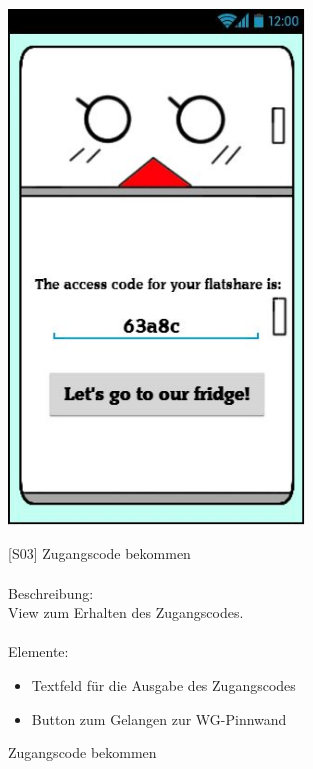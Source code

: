 \documentclass[a4paper]{scrreprt}
\begin{document}
    	\begin{figure}[h]
    		\begin{minipage}[b]{0.4\linewidth}
    			
    			\flushright
    			\centering
    			\includegraphics[width=0.7\textwidth]{fridget_accesscode.JPG}
    			\caption{Zugangscode bekommen}
    			\label{fig:figure1}
    			\vspace{13mm}
    		\end{minipage}
    		\hspace{0.5cm}
    		\begin{minipage}[b]{0.55\linewidth}
    			\flushleft
    			
    			{[}S03{]} Zugangscode bekommen \\
    			\hfill
    			\\Beschreibung: \\
    			View zum Erhalten des Zugangscodes.\\
    			\hfill
    			\\Elemente:
    			\begin{itemize}
    				\renewcommand\labelitemi{--}
    				\item Textfeld für die Ausgabe des Zugangscodes
    				\item Button zum Gelangen zur WG-Pinnwand
    				

\end{itemize}
\end{minipage}
\end{figure}
\end{document}
